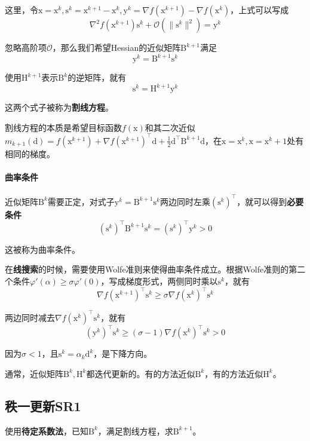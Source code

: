 \documentclass[a4paper]{D:/repositories/MyDGP/latex/PaperReadingLog}
\begin{document}
这里，令$\mathrm{x}=\mathrm{x}^k,\mathrm{s}^k=\mathrm{x}^{k+1}-\mathrm{x}^k,\mathrm{y}^k=\nabla f(\mathrm{x}^{k+1})-\nabla f(\mathrm{x}^k)$，上式可以写成
$$
\nabla^2f(\mathrm{x}^{k+1})\mathrm{s}^k+\mathcal{O}(\lVert \mathrm{s}^k \lVert^2)=\mathrm{y}^k
$$

忽略高阶项$\mathcal{O}$，那么我们希望Hessian的近似矩阵$\mathrm{B}^{k+1}$满足
$$
\mathrm{y}^k=\mathrm{B}^{k+1}\mathrm{s}^k
$$

使用$\mathrm{H}^{k+1}$表示$\mathrm{B}^k$的逆矩阵，就有
$$
\mathrm{s}^k=\mathrm{H}^{k+1}\mathrm{y}^k
$$

这两个式子被称为\textbf{割线方程}。

割线方程的本质是希望目标函数$f(\mathrm{x})$和其二次近似$m_{k+1}(\mathrm{d})=f(\mathrm{x}^{k+1})+\nabla f(\mathrm{x}^{k+1})^\top \mathrm{d}+\frac{1}{2}\mathrm{d}^\top \mathrm{B}^{k+1}\mathrm{d}$，在$\mathrm{x}=\mathrm{x}^k,\mathrm{x}=\mathrm{x}^k+1$处有相同的梯度。

\paragraph{曲率条件}
近似矩阵$\mathrm{B}^k$需要正定，对式子$\mathrm{y}^k=\mathrm{B}^{k+1}\mathrm{s}^k$两边同时左乘$(\mathrm{s}^k)^\top$，就可以得到\textbf{必要条件}
$$
(\mathrm{s}^k)^\top \mathrm{B}^{k+1}\mathrm{s}^k=(\mathrm{s}^k)^\top \mathrm{y}^k>0
$$

这被称为曲率条件。

在\textbf{线搜索}的时候，需要使用Wolfe准则来使得曲率条件成立。根据Wolfe准则的第二个条件$\varphi'(\alpha)\ge \sigma\varphi'(0)$，写成梯度形式，两侧同时乘以$\mathrm{s}^k$，就有
$$
\nabla f(\mathrm{x}^{k+1})^\top \mathrm{s}^k\ge \sigma\nabla f(\mathrm{x}^k)^\top \mathrm{s}^k
$$

两边同时减去$\nabla f(\mathrm{x}^k)^\top \mathrm{s}^k$，就有
$$
(\mathrm{y}^k)^\top \mathrm{s}^k\ge (\sigma-1)\nabla f(\mathrm{x}^k)^\top \mathrm{s}^k>0
$$

因为$\sigma<1$，且$\mathrm{s}^k=\alpha_k\mathrm{d}^k$，是下降方向。

通常，近似矩阵$\mathrm{B}^k,\mathrm{H}^k$都迭代更新的。有的方法近似$\mathrm{B}^k$，有的方法近似$\mathrm{H}^k$。


\subsection{秩一更新SR1}

使用\textbf{待定系数法}，已知$\mathrm{B}^k$，满足割线方程，求$\mathrm{B}^{k+1}$。
\end{document}
